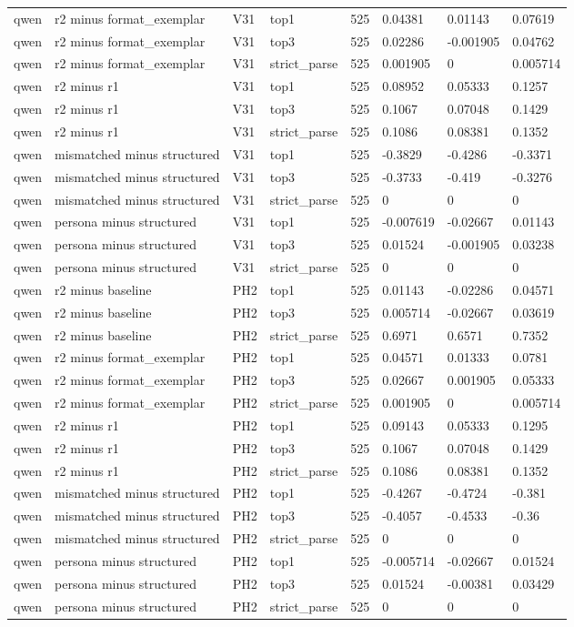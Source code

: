 \begin{tabular}{llllllll}
qwen & r2 minus format\_exemplar & V31 & top1 & 525 & 0.04381 & 0.01143 & 0.07619 \\
qwen & r2 minus format\_exemplar & V31 & top3 & 525 & 0.02286 & -0.001905 & 0.04762 \\
qwen & r2 minus format\_exemplar & V31 & strict\_parse & 525 & 0.001905 & 0 & 0.005714 \\
qwen & r2 minus r1 & V31 & top1 & 525 & 0.08952 & 0.05333 & 0.1257 \\
qwen & r2 minus r1 & V31 & top3 & 525 & 0.1067 & 0.07048 & 0.1429 \\
qwen & r2 minus r1 & V31 & strict\_parse & 525 & 0.1086 & 0.08381 & 0.1352 \\
qwen & mismatched minus structured & V31 & top1 & 525 & -0.3829 & -0.4286 & -0.3371 \\
qwen & mismatched minus structured & V31 & top3 & 525 & -0.3733 & -0.419 & -0.3276 \\
qwen & mismatched minus structured & V31 & strict\_parse & 525 & 0 & 0 & 0 \\
qwen & persona minus structured & V31 & top1 & 525 & -0.007619 & -0.02667 & 0.01143 \\
qwen & persona minus structured & V31 & top3 & 525 & 0.01524 & -0.001905 & 0.03238 \\
qwen & persona minus structured & V31 & strict\_parse & 525 & 0 & 0 & 0 \\
qwen & r2 minus baseline & PH2 & top1 & 525 & 0.01143 & -0.02286 & 0.04571 \\
qwen & r2 minus baseline & PH2 & top3 & 525 & 0.005714 & -0.02667 & 0.03619 \\
qwen & r2 minus baseline & PH2 & strict\_parse & 525 & 0.6971 & 0.6571 & 0.7352 \\
qwen & r2 minus format\_exemplar & PH2 & top1 & 525 & 0.04571 & 0.01333 & 0.0781 \\
qwen & r2 minus format\_exemplar & PH2 & top3 & 525 & 0.02667 & 0.001905 & 0.05333 \\
qwen & r2 minus format\_exemplar & PH2 & strict\_parse & 525 & 0.001905 & 0 & 0.005714 \\
qwen & r2 minus r1 & PH2 & top1 & 525 & 0.09143 & 0.05333 & 0.1295 \\
qwen & r2 minus r1 & PH2 & top3 & 525 & 0.1067 & 0.07048 & 0.1429 \\
qwen & r2 minus r1 & PH2 & strict\_parse & 525 & 0.1086 & 0.08381 & 0.1352 \\
qwen & mismatched minus structured & PH2 & top1 & 525 & -0.4267 & -0.4724 & -0.381 \\
qwen & mismatched minus structured & PH2 & top3 & 525 & -0.4057 & -0.4533 & -0.36 \\
qwen & mismatched minus structured & PH2 & strict\_parse & 525 & 0 & 0 & 0 \\
qwen & persona minus structured & PH2 & top1 & 525 & -0.005714 & -0.02667 & 0.01524 \\
qwen & persona minus structured & PH2 & top3 & 525 & 0.01524 & -0.00381 & 0.03429 \\
qwen & persona minus structured & PH2 & strict\_parse & 525 & 0 & 0 & 0 \\
\bottomrule
\end{tabular}
